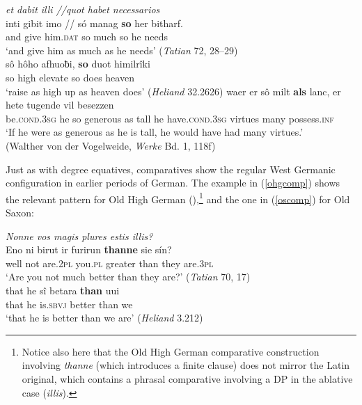 \ea
\ea \textit{et dabit illi //quot habet necessarios}\\
\gll inti gibit imo // só manag \textbf{so} her bitharf. \label{ohgch5}\\
and give him.\textsc{dat} {} so much so he needs\\
\glt `and give him as much as he needs' (\textit{Tatian} 72, 28--29)\\
\ex \gll sô hôho afhuoƀi, \textbf{so} duot himilrîki \label{os}\\
so high elevate so does heaven\\
\glt `raise as high up as heaven does' (\textit{Heliand} 32.2626)
\ex \gll waer er s\^{o} milt \textbf{als} lanc, er hete tugende vil besezzen \label{vogelweide}\\
be.\textsc{cond.3sg} he so generous as tall he have.\textsc{cond.3sg} virtues many possess.\textsc{inf}\\
\glt `If he were as generous as he is tall, he would have had many virtues.'\\(Walther von der Vogelweide, \textit{Werke} Bd. 1, 118f)
\z
\z

Just as with degree equatives, comparatives show the regular West Germanic configuration in earlier periods of German. The example in (\ref{ohgcomp}) shows the relevant pattern for Old High German (\citealt[38, ex. 34]{jaeger2018}),\footnote{Notice also here that the Old High German comparative construction involving \textit{thanne} (which introduces a finite clause) does not mirror the Latin original, which contains a phrasal comparative involving a DP in the ablative case (\textit{illis}).} and the one in (\ref{oscomp}) for Old Saxon:

\ea \label{denn}
\ea \textit{Nonne vos magis plures estis illis?}\\
\gll Eno ni birut ir furirun \textbf{thanne} sie sín? \label{ohgcomp}\\
well not are.\textsc{2pl} you.\textsc{pl} greater than they are.\textsc{3pl}\\
\glt `Are you not much better than they are?' (\textit{Tatian} 70, 17)\\
\ex \gll that he sî betara \textbf{than} uui \label{oscomp}\\
that he is.\textsc{sbvj} better than we\\
\glt `that he is better than we are' (\textit{Heliand} 3.212)
\z
\z

